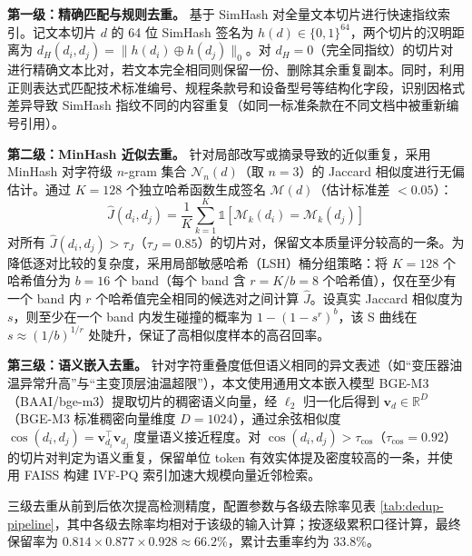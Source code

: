 \documentclass[fontset=fandol,type=master,campus=shenzhen,etitleauto=true]{hithesisbook}
\begin{document}
\textbf{第一级：精确匹配与规则去重。} 基于 SimHash 对全量文本切片进行快速指纹索引\cite{ref59,ref60}。记文本切片 $d$ 的 64 位 SimHash 签名为 $h(d) \in \{0,1\}^{64}$，两个切片的汉明距离为 $d_H(d_i, d_j) = \|h(d_i) \oplus h(d_j)\|_0$。对 $d_H = 0$（完全同指纹）的切片对进行精确文本比对，若文本完全相同则保留一份、删除其余重复副本。同时，利用正则表达式匹配技术标准编号、规程条款号和设备型号等结构化字段，识别因格式差异导致 SimHash 指纹不同的内容重复（如同一标准条款在不同文档中被重新编号引用）。

\textbf{第二级：MinHash 近似去重。} 针对局部改写或摘录导致的近似重复，采用 MinHash 对字符级 $n$-gram 集合 $\mathcal{N}_n(d)$（取 $n = 3$）的 Jaccard 相似度进行无偏估计\cite{ref61}。通过 $K = 128$ 个独立哈希函数生成签名 $\mathcal{M}(d)$（估计标准差 $< 0.05$）：
\begin{equation}
\hat{J}(d_i, d_j) = \frac{1}{K} \sum_{k=1}^{K} \mathbb{1}\left[\mathcal{M}_k(d_i) = \mathcal{M}_k(d_j)\right]
\end{equation}
对所有 $\hat{J}(d_i, d_j) > \tau_J$（$\tau_J = 0.85$）的切片对，保留文本质量评分较高的一条。为降低逐对比较的复杂度，采用局部敏感哈希（LSH）桶分组策略\cite{ref62}：将 $K=128$ 个哈希值分为 $b=16$ 个 band（每个 band 含 $r = K/b = 8$ 个哈希值），仅在至少有一个 band 内 $r$ 个哈希值完全相同的候选对之间计算 $\hat{J}$。设真实 Jaccard 相似度为 $s$，则至少在一个 band 内发生碰撞的概率为 $1 - (1 - s^r)^b$，该 S 曲线在 $s \approx (1/b)^{1/r}$ 处陡升，保证了高相似度样本的高召回率。

\textbf{第三级：语义嵌入去重。} 针对字符重叠度低但语义相同的异文表述（如``变压器油温异常升高''与``主变顶层油温超限''），本文使用通用文本嵌入模型 BGE-M3（BAAI/bge-m3）提取切片的稠密语义向量，经 $\ell_2$ 归一化后得到 $\mathbf{v}_d \in \mathbb{R}^{D}$（BGE-M3 标准稠密向量维度 $D = 1024$），通过余弦相似度 $\cos(d_i, d_j) = \mathbf{v}_{d_i}^{\top} \mathbf{v}_{d_j}$ 度量语义接近程度。对 $\cos(d_i, d_j) > \tau_{\cos}$（$\tau_{\cos} = 0.92$）的切片对判定为语义重复，保留单位 token 有效实体提及密度较高的一条，并使用 FAISS 构建 IVF-PQ 索引加速大规模向量近邻检索\cite{ref63}。

三级去重从前到后依次提高检测精度，配置参数与各级去除率见表 \ref{tab:dedup-pipeline}，其中各级去除率均相对于该级的输入计算；按逐级累积口径计算，最终保留率为 $0.814 \times 0.877 \times 0.928 \approx 66.2\%$，累计去重率约为 33.8\%。
\end{document}
